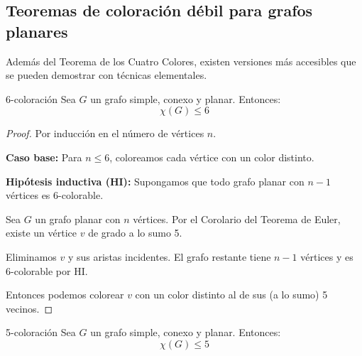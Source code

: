 \subsection{Teoremas de coloración débil para grafos planares}

Además del Teorema de los Cuatro Colores, existen versiones más accesibles que se pueden demostrar con técnicas elementales.

\begin{thmblock}{6-coloración}
Sea \( G \) un grafo simple, conexo y planar. Entonces:
\[ \chi(G) \leq 6 \]
\end{thmblock}

\begin{proof} Por inducción en el número de vértices \( n \).

\textbf{Caso base:} Para \( n \leq 6 \), coloreamos cada vértice con un color distinto.

\textbf{Hipótesis inductiva (HI):} Supongamos que todo grafo planar con \( n-1 \) vértices es 6-colorable.

Sea \( G \) un grafo planar con \( n \) vértices. Por el Corolario del Teorema de Euler, existe un vértice \( v \) de grado a lo sumo 5.

Eliminamos \( v \) y sus aristas incidentes. El grafo restante tiene \( n-1 \) vértices y es 6-colorable por HI.

Entonces podemos colorear \( v \) con un color distinto al de sus (a lo sumo) 5 vecinos.
\end{proof}

\begin{thmblock}{5-coloración}
Sea \( G \) un grafo simple, conexo y planar. Entonces:
\[ \chi(G) \leq 5 \]
\end{thmblock}

